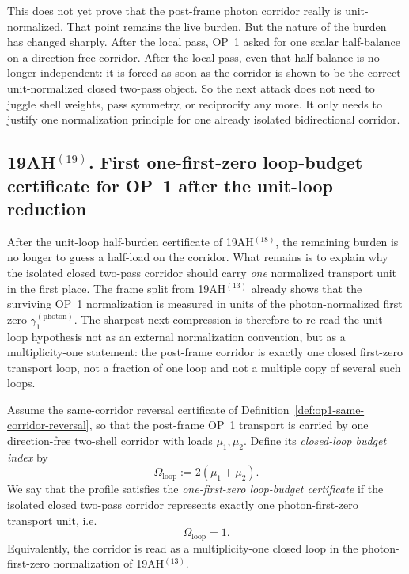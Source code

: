 \begin{remark}
This does not yet prove that the post-frame photon corridor really is unit-normalized. That point remains the live burden. But the nature of the burden has changed sharply. After the local pass, OP~1 asked for one scalar half-balance on a direction-free corridor. After the local pass, even that half-balance is no longer independent: it is forced as soon as the corridor is shown to be the correct unit-normalized closed two-pass object. So the next attack does not need to juggle shell weights, pass symmetry, or reciprocity any more. It only needs to justify one normalization principle for one already isolated bidirectional corridor.
\end{remark}


\subsection*{19AH$^{(19)}$. First one-first-zero loop-budget certificate for OP~1 after the unit-loop reduction}
After the unit-loop half-burden certificate of 19AH$^{(18)}$, the remaining burden is no longer to guess a half-load on the corridor. What remains is to explain why the isolated closed two-pass corridor should carry \emph{one} normalized transport unit in the first place. The frame split from 19AH$^{(13)}$ already shows that the surviving OP~1 normalization is measured in units of the photon-normalized first zero \(\gamma_1^{(\mathrm{photon})}\). The sharpest next compression is therefore to re-read the unit-loop hypothesis not as an external normalization convention, but as a multiplicity-one statement: the post-frame corridor is exactly one closed first-zero transport loop, not a fraction of one loop and not a multiple copy of several such loops.

\begin{definition}
\label{def:op1-one-first-zero-loop-budget}
Assume the same-corridor reversal certificate of Definition~\ref{def:op1-same-corridor-reversal}, so that the post-frame OP~1 transport is carried by one direction-free two-shell corridor with loads \(\mu_1,\mu_2\). Define its \emph{closed-loop budget index} by
\[
 \Omega_{\mathrm{loop}} := 2(\mu_1+\mu_2).
\]
We say that the profile satisfies the \emph{one-first-zero loop-budget certificate} if the isolated closed two-pass corridor represents exactly one photon-first-zero transport unit, i.e.
\[
 \Omega_{\mathrm{loop}} = 1.
\]
Equivalently, the corridor is read as a multiplicity-one closed loop in the photon-first-zero normalization of 19AH$^{(13)}$.
\end{definition}

